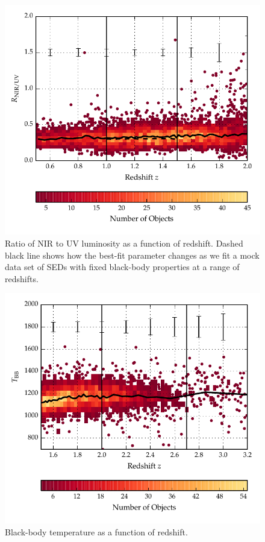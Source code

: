 \begin{figure}
  \centering
  \includegraphics[width=\textwidth]{figures/chapter06/ratio_z_errors.pdf}
  \caption{Ratio of NIR to UV luminosity as a function of redshift. Dashed black line shows how the best-fit parameter changes as we fit a mock data set of SEDs with fixed black-body properties at a range of redshifts.}
  \label{fig:}
\end{figure}

\begin{figure}
  \centering
  \includegraphics[width=\textwidth]{figures/chapter06/bbt_z_errors_highz.pdf}
  \caption{Black-body temperature as a function of redshift.}
  \label{fig:}
\end{figure}

